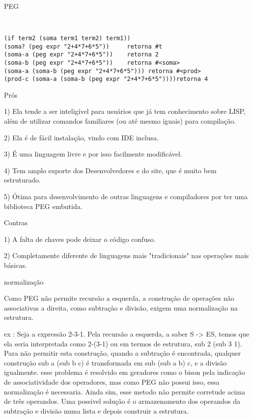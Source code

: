 \documentclass{beamer}
\begin{document}

\begin{frame}[fragile]{PEG}
\begin{verbatim}


(if term2 (soma term1 term2) term1))
(soma? (peg expr "2+4*7+6*5"))     retorna #t
(soma-a (peg expr "2+4*7+6*5"))    retorna 2
(soma-b (peg expr "2+4*7+6*5"))    retorna #<soma>
(soma-a (soma-b (peg expr "2+4*7+6*5"))) retorna #<prod>
(prod-c (soma-a (soma-b (peg expr "2+4*7+6*5"))))retorna 4
\end{verbatim}
\end{frame}


\begin{frame}{Prós}

1) Ela tende a ser inteligível para usuários que já tem conhecimento sobre LISP, além de utilizar comandos familiares (ou até mesmo iguais) para compilação.

2) Ela é de fácil instalação, vindo com IDE inclusa.

3) É uma linguagem livre e por isso facilmente modificável.

4) Tem amplo suporte dos Desenvolvedores e do site, que é muito bem estruturado.

5) Ótima para desenvolvimento de outras linguagens e compiladores por ter uma biblioteca PEG embutida.


\end{frame}
\begin{frame}{Contras}

1) A falta de chaves pode deixar o código confuso.

2) Completamente diferente de linguagens mais "tradicionais" nas operações mais básicas.


\end{frame}

\begin{frame}{normalização}

Como PEG não permite recursão a esquerda, a construção de operações não associativas
a direita, como subtração e divisão, exigem uma normalização na estrutura.

ex : Seja a expressão 2-3-1. Pela recursão a esquerda, a saber S -> ES, temos que ela seria interpretada
como 2-(3-1) ou em termos de estrutura, sub 2 (sub 3 1).  Para não permitir esta construção, quando a subtração
é encontrada, qualquer construção sub a (sub b c) é transformada em sub (sub a b) c, e a divisão igualmente.
esse problema é resolvido em geradores como o bison pela indicação de associatividade dos operadores, mas
como PEG não possui isso, essa normalização é necessaria. Ainda sim, esse metodo não permite corretude acima
de três operandos. Uma possivel solução é o armazenamento dos operandos da subtração e divisão numa lista e depois
construir a estrutura. 

\end{frame}
\end{document}
